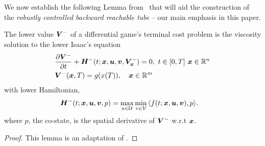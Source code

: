 We now establish the following Lemma from~\cite{Souganidis} that will aid the construction of the \textit{robustly controlled backward reachable tube} -- our main emphasis in this paper. 
%
\begin{lemma}
	The lower value $\bm{V}^-$ of a differential game's terminal cost problem is the viscosity solution to the lower Isaac's equation 
	\begin{subequations}
		\begin{align}
			&\frac{\partial \bm{V}^-}{\partial t} + \bm{H}^- (t; \bm{x}, \bm{u}, \bm{v}, \bm{V}^-_{\bm{x}}) = 0, \,\, t\in \left[0, T\right]\, \bm{x} \in \mathbb{R}^n  \\
			&\bm{V}^-(\bm{x}, T) = g(x(T)), \quad \bm{x} \in \mathbb{R}^m
			\label{eq:lower_visc_boundary}
		\end{align}
		\label{eq:lower_visc}
	\end{subequations}
	with lower Hamiltonian, 
	\begin{align}
		&\bm{H}^- (t; \bm{x}, \bm{u}, \bm{v}, p) = \max_{u \in \mathcal{U}} \min_{v \in \mathcal{V}} \, \langle f(t; \bm{x}, \bm{u}, \bm{v}), p  \rangle.
		\label{eq:lower_visc_ham}
	\end{align}
	where $p$, the co-state, is the spatial derivative of $\bm{V}^-$ w.r.t $\bm{x}$.
	\label{lemma:lower_visc_lemma}
\end{lemma}
%
\begin{proof}
	This lemma is an adaptation of \cite[Th 4.1]{Souganidis}.
\end{proof}

